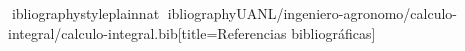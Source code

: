\documentclass[spanish,letterpaper,oneside]{article}
\begin{document}
\hypersetup{pageanchor=false}
\begingroup
\fontsize{14}{17}\selectfont
\renewcommand{\Huge}{\fontsize{14}{17}\selectfont\bfseries}
\renewcommand{\large}{\fontsize{14}{17}\selectfont}
\templatePortrait
\clearpage
\endgroup
\hypersetup{pageanchor=true}
\templatePagecfg
\singlespacing
\setlength{\tabcolsep}{8pt}
\renewcommand{\arraystretch}{1.18}

\newpage
ibliographystyle{plainnat}
ibliography{UANL/ingeniero-agronomo/calculo-integral/calculo-integral.bib}[title={Referencias bibliográficas}]
\end{document}
